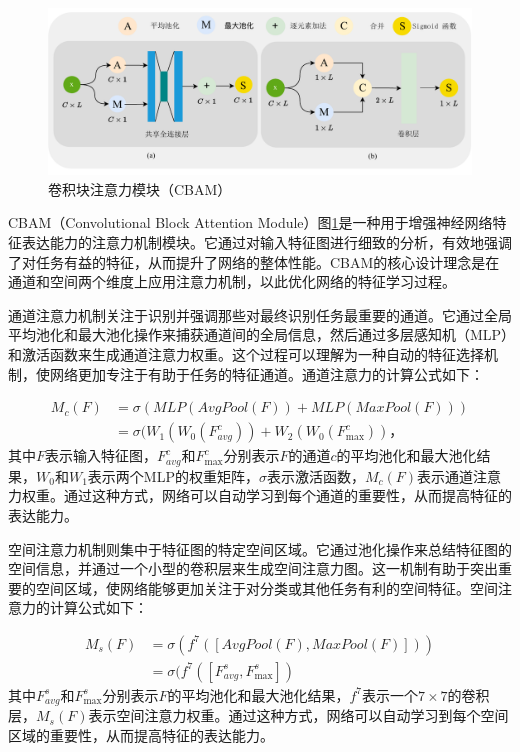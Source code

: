 \begin{figure}
    \centering
    \includegraphics[width=\textwidth]{Image/CBAM_cn.pdf}
    \caption{卷积块注意力模块（CBAM）}
    \label{fig:cbam}
\end{figure}

CBAM（Convolutional Block Attention Module）图\ref{fig:cbam}是一种用于增强神经网络特征表达能力的注意力机制模块。它通过对输入特征图进行细致的分析，有效地强调了对任务有益的特征，从而提升了网络的整体性能。CBAM的核心设计理念是在通道和空间两个维度上应用注意力机制，以此优化网络的特征学习过程。

通道注意力机制关注于识别并强调那些对最终识别任务最重要的通道。它通过全局平均池化和最大池化操作来捕获通道间的全局信息，然后通过多层感知机（MLP）和激活函数来生成通道注意力权重。这个过程可以理解为一种自动的特征选择机制，使网络更加专注于有助于任务的特征通道。通道注意力的计算公式如下：

\begin{equation}
    \begin{aligned}
    M_c(F) &= \sigma(MLP(AvgPool(F)) + MLP(MaxPool(F))) \\ 
    &= \sigma(W_1(W_0(F_{avg}^c)) + W_2(W_0(F_{\max}^c))，
    \end{aligned}
    \label{equ:CAM}
\end{equation}
其中$F$表示输入特征图，$F_{avg}^c$和$F_{\max}^c$分别表示$F$的通道$c$的平均池化和最大池化结果，$W_0$和$W_1$表示两个MLP的权重矩阵，$\sigma$表示激活函数，$M_c(F)$表示通道注意力权重。通过这种方式，网络可以自动学习到每个通道的重要性，从而提高特征的表达能力。

空间注意力机制则集中于特征图的特定空间区域。它通过池化操作来总结特征图的空间信息，并通过一个小型的卷积层来生成空间注意力图。这一机制有助于突出重要的空间区域，使网络能够更加关注于对分类或其他任务有利的空间特征。空间注意力的计算公式如下：

\begin{equation}
    \begin{aligned}
    M_s(F) &= \sigma(f^{7}([AvgPool(F), MaxPool(F)])) \\
    &= \sigma(f^{7}([F_{avg}^s, F_{\max}^s])
    \end{aligned}
    \label{equ:SAM}
\end{equation}
其中$F_{avg}^s$和$F_{\max}^s$分别表示$F$的平均池化和最大池化结果，$f^7$表示一个$7 \times 7$的卷积层，$M_s(F)$表示空间注意力权重。通过这种方式，网络可以自动学习到每个空间区域的重要性，从而提高特征的表达能力。

